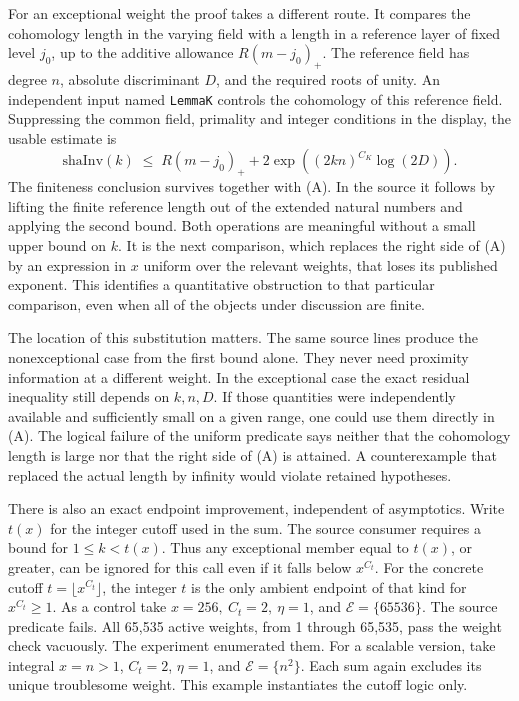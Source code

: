 \documentclass[12pt,letterpaper]{article}
\begin{document}
For an exceptional weight the proof takes a different route. It compares the cohomology length in the varying field with a length in a reference layer of fixed level \(j_0\), up to the additive allowance \(R(m-j_0)_+\). The reference field has degree \(n\), absolute discriminant \(D\), and the required roots of unity. An independent input named \texttt{LemmaK} controls the cohomology of this reference field. Suppressing the common field, primality and integer conditions in the display, the usable estimate is
\[
 \mathrm{shaInv}(k)\;\le\; R(m-j_0)_+
       +2\exp\!\left((2kn)^{C_K}\log(2D)\right).
 \tag{A}\label{eq:band-raw}
\]
The finiteness conclusion survives together with (A). In the source it follows by lifting the finite reference length out of the extended natural numbers and applying the second bound. Both operations are meaningful without a small upper bound on \(k\). It is the next comparison, which replaces the right side of (A) by an expression in \(x\) uniform over the relevant weights, that loses its published exponent. This identifies a quantitative obstruction to that particular comparison, even when all of the objects under discussion are finite.   

The location of this substitution matters. The same source lines produce the nonexceptional case from the first bound alone. They never need proximity information at a different weight. In the exceptional case the exact residual inequality still depends on \(k,n,D\). If those quantities were independently available and sufficiently small on a given range, one could use them directly in (A). The logical failure of the uniform predicate says neither that the cohomology length is large nor that the right side of (A) is attained. A counterexample that replaced the actual length by infinity would violate retained hypotheses.

There is also an exact endpoint improvement, independent of asymptotics. Write \(t(x)\) for the integer cutoff used in the sum. The source consumer requires a bound for \(1\le k<t(x)\). Thus any exceptional member equal to \(t(x)\), or greater, can be ignored for this call even if it falls below \(x^{C_t}\). For the concrete cutoff \(t=\lfloor x^{C_t}\rfloor\), the integer \(t\) is the only ambient endpoint of that kind for \(x^{C_t}\ge1\). As a control take \(x=256,\ C_t=2,\ \eta=1\), and \(\mathcal E=\{65536\}\). The source predicate fails. All 65,535 active weights, from 1 through 65,535, pass the weight check vacuously. The experiment enumerated them. For a scalable version, take integral \(x=n>1\), \(C_t=2\), \(\eta=1\), and \(\mathcal E=\{n^2\}\). Each sum again excludes its unique troublesome weight. This example instantiates the cutoff logic only.  
\end{document}
